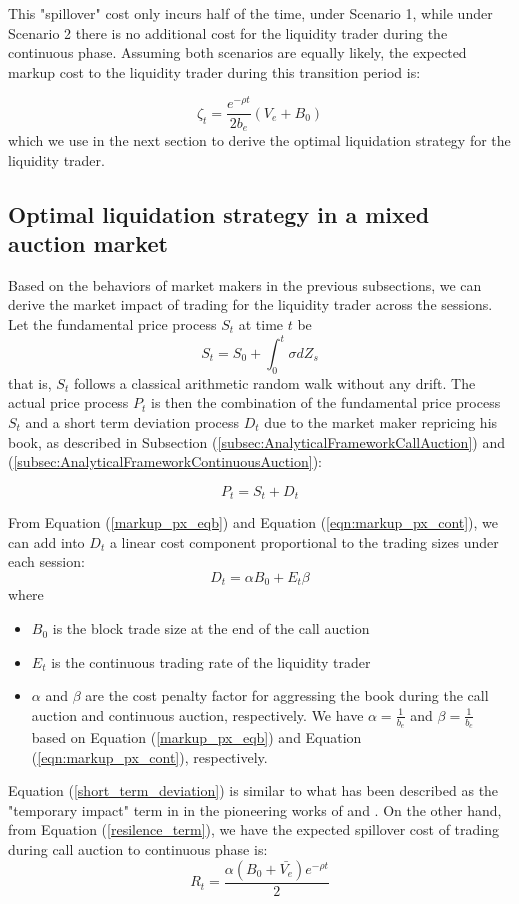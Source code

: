 This "spillover" cost only incurs half of the time, under Scenario 1, while under Scenario 2 there is no additional cost for the liquidity trader during the continuous phase. Assuming both scenarios are equally likely, the expected markup cost to the liquidity trader during this transition period is:

\begin{equation}\label{resilence_term}
  \zeta_t = \frac{e^{-\rho t}}{2 b_e}  (V_e + B_0)
\end{equation}
which we use in the next section to derive the optimal liquidation strategy for the liquidity trader.

\subsection{Optimal liquidation strategy in a mixed auction market}

Based on the behaviors of market makers in the previous subsections, we can derive the market impact of trading for the liquidity trader across the sessions. Let the fundamental price process $S_t$ at time $t$ be
\[
  S_t = S_0 + \int_0^t \sigma dZ_s
\]
that is, $S_t$ follows a classical arithmetic random walk without any drift. The actual price process $P_t$ is then the combination of the fundamental price process $S_t$ and a short term deviation process $D_t$ due to the market maker repricing his book, as described in Subsection (\ref{subsec:AnalyticalFrameworkCallAuction}) and (\ref{subsec:AnalyticalFrameworkContinuousAuction}):

\[
  P_t = S_t + D_t
\]

From Equation (\ref{markup_px_eqb}) and Equation (\ref{eqn:markup_px_cont}), we can add into $D_t$ a linear cost component proportional to the trading sizes under each session:
\begin{equation}\label{short_term_deviation}
  D_t = \alpha B_0 + E_t \beta
\end{equation}
where
\begin{itemize}
  \item $B_0$ is the block trade size at the end of the call auction
  \item $E_t$ is the continuous trading rate of the liquidity trader
  \item $\alpha$ and $\beta$ are the cost penalty factor for aggressing the book during the call auction and continuous auction, respectively. We have $\alpha=\frac{1}{b_e}$ and $\beta=\frac{1}{b_c}$ based on Equation (\ref{markup_px_eqb}) and Equation (\ref{eqn:markup_px_cont}), respectively.
\end{itemize}
Equation (\ref{short_term_deviation}) is similar to what has been described as the "temporary impact" term in in the pioneering works of \cite{BertimasLo1999} and \cite{Almgren2000}. On the other hand, from Equation (\ref{resilence_term}), we have the expected spillover cost of trading during call auction to continuous phase is:
\[
  R_t = \frac{\alpha (B_0 + \bar{V_e}) e^{-\rho t}}{2}
\]

